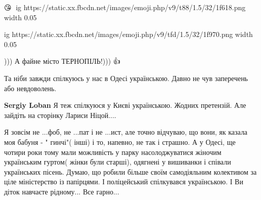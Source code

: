 \begin{itemize}
 
😘🥰
\ifcmt
  ig https://static.xx.fbcdn.net/images/emoji.php/v9/t88/1.5/32/1f618.png
  width 0.05

	ig https://static.xx.fbcdn.net/images/emoji.php/v9/tfd/1.5/32/1f970.png
  width 0.05
\fi


 
))) А файне місто ТЕРНОПІЛЬ!))) 👍💝

 
Та ніби завжди спілкуюсь у нас в Одесі українською. Давно не чув заперечень або невдоволень.

\begin{itemize}
 
\textbf{Sergiy Loban} Я теж спілкуюся у Києві українською. Жодних претензій. Але зайдіть на сторінку Лариси Ніцой....
\end{itemize}

 

Я зовсім не ...фоб, не ...пат і не ...ист, але точно відчуваю, що вони, як
казала моя бабуня - " гинчі"( інші) і то, напевно, не так і страшно. А у Одесі,
ще чотири роки тому мали можливість у парку насолоджуватися жіночим українським
гуртом( жінки були старші), одягнені у вишиванки і співали українських пісень.
Думаю, що робили більше своїм самодіяльним колективом за ціле міністерство із
папірцями. І поліцейський спілкувався українською. І Ви діток навчаєте
рідному... Все гарно...



\end{itemize}
